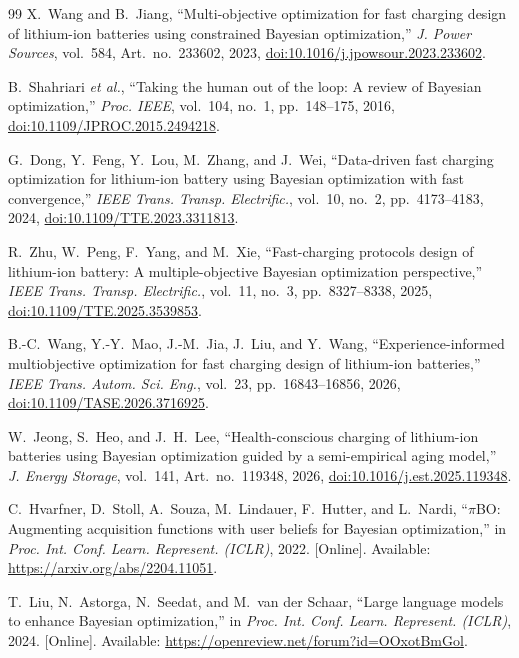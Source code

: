 \documentclass[journal]{IEEEtran}
\begin{document}
\begin{thebibliography}{99}
X.~Wang and B.~Jiang,
``Multi-objective optimization for fast charging design of lithium-ion
batteries using constrained Bayesian optimization,''
\textit{J. Power Sources}, vol.~584, Art.~no.~233602, 2023,
\href{https://doi.org/10.1016/j.jpowsour.2023.233602}
{doi:10.1016/j.jpowsour.2023.233602}.

B.~Shahriari \textit{et al.},
``Taking the human out of the loop: A review of Bayesian optimization,''
\textit{Proc. IEEE}, vol.~104, no.~1, pp.~148--175, 2016,
\href{https://doi.org/10.1109/JPROC.2015.2494218}
{doi:10.1109/JPROC.2015.2494218}.

G.~Dong, Y.~Feng, Y.~Lou, M.~Zhang, and J.~Wei,
``Data-driven fast charging optimization for lithium-ion battery
using Bayesian optimization with fast convergence,''
\textit{IEEE Trans. Transp. Electrific.},
vol.~10, no.~2, pp.~4173--4183, 2024,
\href{https://doi.org/10.1109/TTE.2023.3311813}
{doi:10.1109/TTE.2023.3311813}.

R.~Zhu, W.~Peng, F.~Yang, and M.~Xie,
``Fast-charging protocols design of lithium-ion battery:
A multiple-objective Bayesian optimization perspective,''
\textit{IEEE Trans. Transp. Electrific.},
vol.~11, no.~3, pp.~8327--8338, 2025,
\href{https://doi.org/10.1109/TTE.2025.3539853}
{doi:10.1109/TTE.2025.3539853}.

B.-C.~Wang, Y.-Y.~Mao, J.-M.~Jia, J.~Liu, and Y.~Wang,
``Experience-informed multiobjective optimization for fast
charging design of lithium-ion batteries,''
\textit{IEEE Trans. Autom. Sci. Eng.},
vol.~23, pp.~16843--16856, 2026,
\href{https://doi.org/10.1109/TASE.2026.3716925}
{doi:10.1109/TASE.2026.3716925}.

W.~Jeong, S.~Heo, and J.~H.~Lee,
``Health-conscious charging of lithium-ion batteries using
Bayesian optimization guided by a semi-empirical aging model,''
\textit{J. Energy Storage},
vol.~141, Art.~no.~119348, 2026,
\href{https://doi.org/10.1016/j.est.2025.119348}
{doi:10.1016/j.est.2025.119348}.

C.~Hvarfner, D.~Stoll, A.~Souza, M.~Lindauer,
F.~Hutter, and L.~Nardi,
``$\pi$BO: Augmenting acquisition functions with user beliefs
for Bayesian optimization,''
in \textit{Proc. Int. Conf. Learn. Represent. (ICLR)}, 2022.
[Online]. Available:
\url{https://arxiv.org/abs/2204.11051}.

T.~Liu, N.~Astorga, N.~Seedat, and M.~van der Schaar,
``Large language models to enhance Bayesian optimization,''
in \textit{Proc. Int. Conf. Learn. Represent. (ICLR)}, 2024.
[Online]. Available:
\url{https://openreview.net/forum?id=OOxotBmGol}.


\end{thebibliography}
\end{document}
